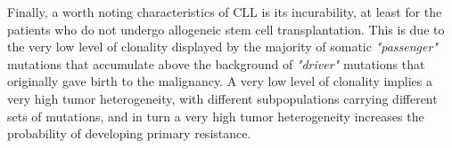 \vspace{0.4cm}
Finally, a worth noting characteristics of CLL is its incurability, at least for the patients who do not undergo allogeneic stem cell transplantation. This is due to the very low level of clonality displayed by the majority of somatic \textit{"passenger"} mutations that accumulate above the background of \textit{"driver"} mutations that originally gave birth to the malignancy. A very low level of clonality implies a very high tumor heterogeneity, with different subpopulations carrying different sets of mutations, and in turn a very high tumor heterogeneity increases the probability of developing primary resistance. \par



